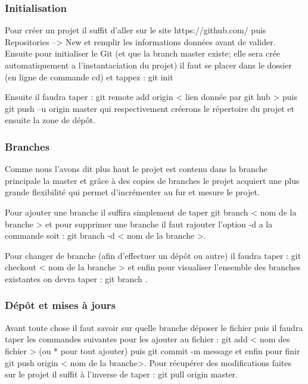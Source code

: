 \documentclass[a4paper, 12pt, twoside]{article}
\begin{document}
\subsubsection{Initialisation}
Pour créer un projet il suffit d'aller sur le site  https://github.com/ puis Repositories --> New et remplir les informations données avant de valider. Ensuite pour initialiser le Git (et que la branch master existe; elle sera crée automatiquement a l'instantaciation du projet) il faut se placer dans le dossier (en ligne de commande cd) et tappez :  git init \newline

Ensuite  il faudra taper :  git remote add origin < lien donnée par git hub >  puis  git push –u origin master  qui respectivement créerons le répertoire du projet et ensuite la zone de dépôt.

\subsubsection{Branches}
Comme nous l'avons dit plus haut le projet est contenu dans la branche principale la master et grâce à des copies de branches le projet acquiert une plus grande flexibilité qui permet d'incrémenter au fur et mesure le projet. \newline

Pour ajouter une branche il suffira simplement de taper  git branch < nom de la branche >  et pour supprimer une branche il faut rajouter l'option -d a la commande soit :  git branch -d < nom de la branche >.\newline

Pour changer de branche (afin d'effectuer un dépôt ou autre) il faudra taper :  git checkout < nom de la branche >   et enfin pour visualiser l'ensemble des branches existantes on devra taper :  git branch .

\subsubsection{Dépôt et mises à jours}
Avant toute chose il faut savoir sur quelle branche déposer le fichier puis il faudra taper les commandes suivantes pour les ajouter  au fichier :  git add < nom des fichier >  (ou * pour tout ajouter) puis  git commit -m message  et enfin pour finir git push origin < nom de la branche>. \newline
Pour récupérer des modifications faites sur le projet il suffit à l'inverse de taper : 
 git pull origin master.
 
\end{document}

